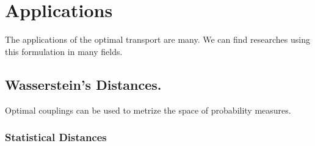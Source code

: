 \chapter{Applications}
The applications of the optimal transport are many. We can find researches using this formulation in many fields.
\section{Wasserstein's Distances.}
Optimal couplings can be used to metrize the space of probability measures.


\subsection{Statistical Distances}


